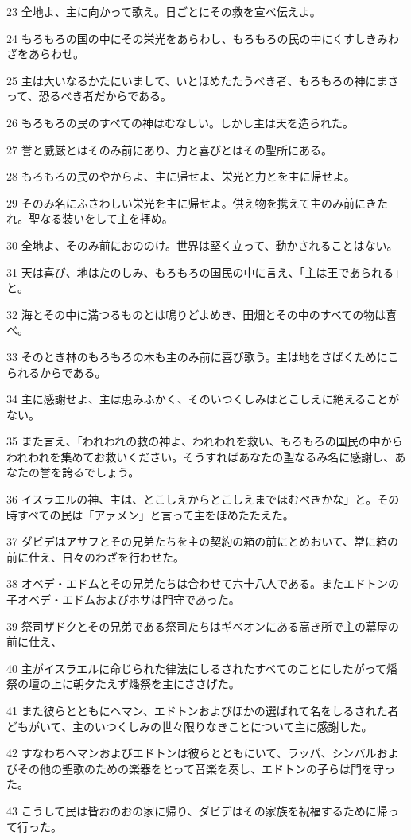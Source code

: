 \par 23 全地よ、主に向かって歌え。日ごとにその救を宣べ伝えよ。
\par 24 もろもろの国の中にその栄光をあらわし、もろもろの民の中にくすしきみわざをあらわせ。
\par 25 主は大いなるかたにいまして、いとほめたたうべき者、もろもろの神にまさって、恐るべき者だからである。
\par 26 もろもろの民のすべての神はむなしい。しかし主は天を造られた。
\par 27 誉と威厳とはそのみ前にあり、力と喜びとはその聖所にある。
\par 28 もろもろの民のやからよ、主に帰せよ、栄光と力とを主に帰せよ。
\par 29 そのみ名にふさわしい栄光を主に帰せよ。供え物を携えて主のみ前にきたれ。聖なる装いをして主を拝め。
\par 30 全地よ、そのみ前におののけ。世界は堅く立って、動かされることはない。
\par 31 天は喜び、地はたのしみ、もろもろの国民の中に言え、「主は王であられる」と。
\par 32 海とその中に満つるものとは鳴りどよめき、田畑とその中のすべての物は喜べ。
\par 33 そのとき林のもろもろの木も主のみ前に喜び歌う。主は地をさばくためにこられるからである。
\par 34 主に感謝せよ、主は恵みふかく、そのいつくしみはとこしえに絶えることがない。
\par 35 また言え、「われわれの救の神よ、われわれを救い、もろもろの国民の中からわれわれを集めてお救いください。そうすればあなたの聖なるみ名に感謝し、あなたの誉を誇るでしょう。
\par 36 イスラエルの神、主は、とこしえからとこしえまでほむべきかな」と。その時すべての民は「アァメン」と言って主をほめたたえた。
\par 37 ダビデはアサフとその兄弟たちを主の契約の箱の前にとめおいて、常に箱の前に仕え、日々のわざを行わせた。
\par 38 オベデ・エドムとその兄弟たちは合わせて六十八人である。またエドトンの子オベデ・エドムおよびホサは門守であった。
\par 39 祭司ザドクとその兄弟である祭司たちはギベオンにある高き所で主の幕屋の前に仕え、
\par 40 主がイスラエルに命じられた律法にしるされたすべてのことにしたがって燔祭の壇の上に朝夕たえず燔祭を主にささげた。
\par 41 また彼らとともにヘマン、エドトンおよびほかの選ばれて名をしるされた者どもがいて、主のいつくしみの世々限りなきことについて主に感謝した。
\par 42 すなわちヘマンおよびエドトンは彼らとともにいて、ラッパ、シンバルおよびその他の聖歌のための楽器をとって音楽を奏し、エドトンの子らは門を守った。
\par 43 こうして民は皆おのおの家に帰り、ダビデはその家族を祝福するために帰って行った。

